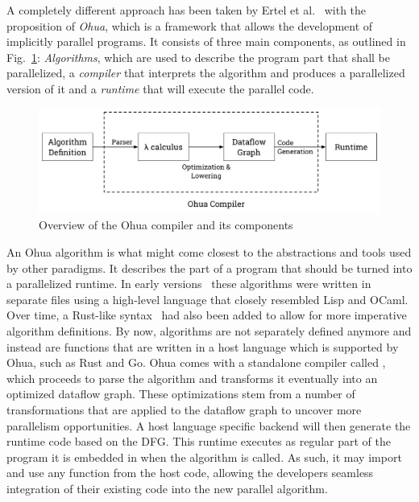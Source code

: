 A completely different approach has been taken by Ertel et al.~\cite{ertel2019dis} with the proposition of \emph{Ohua}, which is a framework that allows the development of implicitly parallel programs.
It consists of three main components, as outlined in Fig.~\ref{fig:background:ohua}:
\emph{Algorithms}, which are used to describe the program part that shall be parallelized, a \emph{compiler} that interprets the algorithm and produces a parallelized version of it and a \emph{runtime} that will execute the parallel code.

\begin{figure}[h]
    \includegraphics[width=\textwidth,keepaspectratio]{gfx/background-ohua}
    \caption{Overview of the Ohua compiler and its components}%
    \label{fig:background:ohua}
\end{figure}

An Ohua algorithm is what might come closest to the abstractions and tools used by other paradigms.
It describes the part of a program that should be turned into a parallelized runtime.
In early versions~\cite{ertel2015ohua} these algorithms were written in separate files using a high-level language that closely resembled Lisp and OCaml.
Over time, a Rust-like syntax~\cite{adam2019master} had also been added to allow for more imperative algorithm definitions.
By now, algorithms are not separately defined anymore and instead are functions that are written in a host language which is supported by Ohua, such as Rust and Go.
Ohua comes with a standalone compiler called , which proceeds to parse the algorithm and transforms it eventually into an optimized dataflow graph.
These optimizations stem from a number of transformations that are applied to the dataflow graph to uncover more parallelism opportunities.
A host language specific backend will then generate the runtime code based on the DFG.
This runtime executes as regular part of the program it is embedded in when the algorithm is called.
As such, it may import and use any function from the host code, allowing the developers seamless integration of their existing code into the new parallel algorithm.

